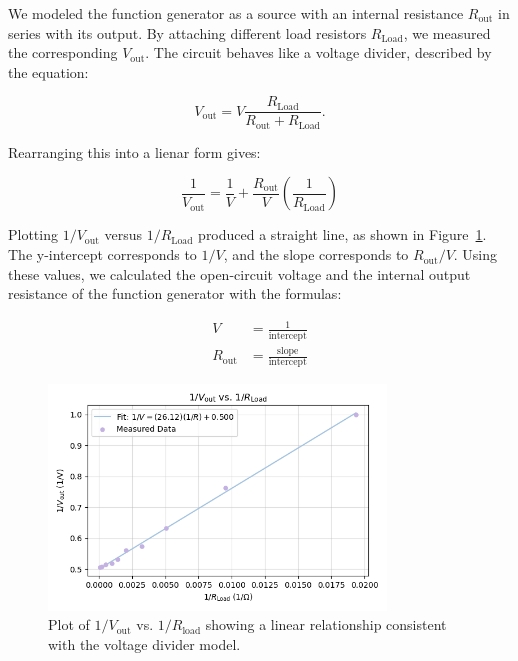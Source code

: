 \documentclass{article}
\begin{document}
We modeled the function generator as a source with an internal resistance
$R_\text{out}$ in series with its output. By attaching different load resistors
$R_\text{Load}$, we measured the corresponding $V_\text{out}$. The circuit
behaves like a voltage divider, described by the equation:

\begin{equation}
    V_\text{out}=V\frac{R_\text{Load}}{R_\text{out}+R_\text{Load}}.
\end{equation}

\noindent Rearranging this into a lienar form gives:

\begin{equation}
    \frac{1}{V_\text{out}}=\frac{1}{V}+\frac{R_\text{out}}{V}\left( \frac{1}{R_\text{Load}}\right)
\end{equation}

\noindent Plotting $1/V_\text{out}$ versus $1/R_\text{Load}$ produced a
straight line, as shown in Figure~\ref{fig:vdiv_plot}. The y-intercept corresponds
to $1/V$, and the slope corresponds to $R_\text{out}/V$. Using these values,
we calculated the open-circuit voltage and the internal output resistance of
the function generator with the formulas:

\begin{align}
    V&=\frac{1}{\text{intercept}}\\
    R_\text{out}&=\frac{\text{slope}}{\text{intercept}}
\end{align}

\begin{figure}[H]
    \centering
    \includegraphics[width=0.8\textwidth]{1.4.d.png}
    \caption{Plot of $1/V_\text{out}$ vs. $1/R_\text{load}$ showing a linear
        relationship consistent with the voltage divider model.}
    \label{fig:vdiv_plot}
\end{figure}
\end{document}
